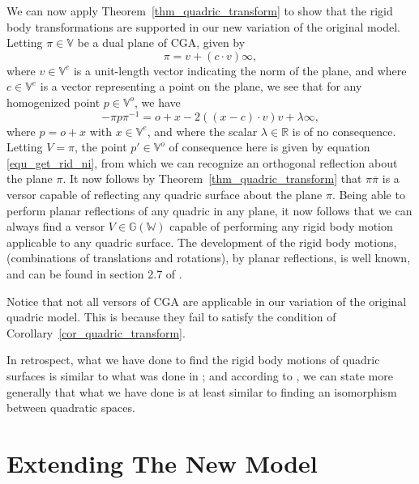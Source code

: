 \documentclass{birkjour}
\theoremstyle{definition}
\theoremstyle{remark}
\numberwithin{equation}{section}
\newcommand{\G}{\mathbb{G}}
\newcommand{\V}{\mathbb{V}}
\newcommand{\W}{\mathbb{W}}
\newcommand{\R}{\mathbb{R}}
\newcommand{\nvao}{o}
\newcommand{\nvai}{\infty}
\begin{document}
We can now apply Theorem~\ref{thm_quadric_transform} to show
that the rigid body transformations are supported in our new variation
of the original model.
Letting $\pi\in\V$ be a dual plane of CGA, given by
\begin{equation}
\pi = v+(c\cdot v)\nvai,
\end{equation}
where $v\in\V^e$ is a unit-length vector indicating the norm of the plane,
and where $c\in\V^e$ is a vector representing a point on the plane,
we see that for any homogenized point $p\in\V^o$, we have
\begin{equation}
-\pi p\pi^{-1} = \nvao+x-2((x-c)\cdot v)v + \lambda\nvai,
\end{equation}
where $p=\nvao+x$ with $x\in\V^e$, and
where the scalar $\lambda\in\R$ is of no consequence.  Letting $V=\pi$,
the point $p'\in\V^o$ of consequence here is given by equation \eqref{equ_get_rid_ni},
from which we can recognize an orthogonal reflection about the plane $\pi$.
It now follows by Theorem~\ref{thm_quadric_transform} that $\pi\overline{\pi}$ is a versor
capable of reflecting any quadric surface about the plane $\pi$.
Being able to perform planar reflections of any quadric in any plane, it
now follows that we can always find a versor $V\in\G(\W)$ capable of performing
any rigid body motion applicable to any quadric surface.  The development
of the rigid body motions, (combinations of translations and rotations), by planar reflections,
is well known, and can be found in section 2.7 of \cite{LiRockwood}.

Notice that not all versors of CGA are applicable in
our variation of the original quadric model.  This is because they fail to
satisfy the condition of Corollary~\ref{cor_quadric_transform}.

In retrospect, what we have done to find the rigid body motions
of quadric surfaces is similar to what was done in \cite{Langer08}; and
according to \cite{Pfister95}, we can state more generally that what we
have done is at least similar to finding an isomorphism between quadratic spaces.

\section{Extending The New Model}
\end{document}
